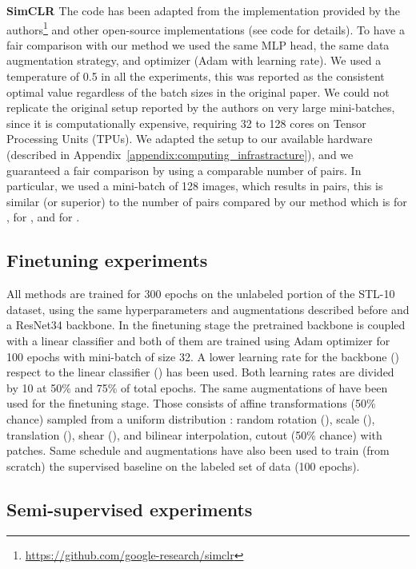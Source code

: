 \documentclass{article}
\begin{document}
\textbf{SimCLR \citep{chen2020simple}} The code has been adapted from the implementation provided by the authors\footnote{\url{https://github.com/google-research/simclr}} and other open-source implementations (see code for details). To have a fair comparison with our method we used the same MLP head, the same data augmentation strategy, and optimizer (Adam with learning rate). We used a temperature of 0.5 in all the experiments, this was reported as the consistent optimal value regardless of the batch sizes in the original paper. We could not replicate the original setup reported by the authors on very large mini-batches, since it is computationally expensive, requiring 32 to 128 cores on Tensor Processing Units (TPUs). We adapted the setup to our available hardware (described in Appendix~\ref{appendix:computing_infrastracture}), and we guaranteed a fair comparison by using a comparable number of pairs. In particular, we used a mini-batch of 128 images, which results in  pairs, this is similar (or superior) to the number of pairs compared by our method which is  for ,  for , and  for .

\subsection{Finetuning experiments}\label{appendix:implementation_finetuning}

All methods are trained for 300 epochs on the unlabeled portion of the STL-10 dataset, using the same hyperparameters and augmentations described before and a ResNet34 backbone. In the finetuning stage the pretrained backbone is coupled with a linear classifier and both of them are trained using Adam optimizer for 100 epochs with mini-batch of size 32. A lower learning rate for the backbone () respect to the linear classifier () has been used. Both learning rates are divided by 10 at 50\% and 75\% of total epochs. The same augmentations of \cite{ji2019invariant} have been used for the finetuning stage. Those consists of affine transformations (50\% chance) sampled from a uniform distribution : random rotation (), scale (), translation (), shear (), and bilinear interpolation, cutout (50\% chance) with  patches. Same schedule and augmentations have also been used to train (from scratch) the supervised baseline on the labeled set of data (100 epochs).


\subsection{Semi-supervised experiments}
\end{document}
